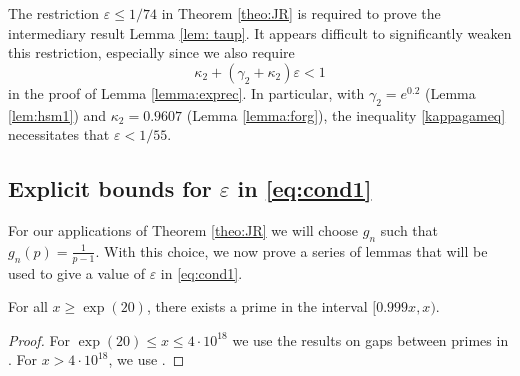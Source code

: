 \documentclass[12pt]{amsart}
\begin{document}
\begin{remark}
    The restriction $\varepsilon\leq 1/74$ in Theorem \ref{theo:JR} is required to prove the intermediary result Lemma \ref{lem: taup}. It appears difficult to significantly weaken this restriction, especially since we also require 
    \begin{equation}\label{kappagameq}
        \kappa_2+(\gamma_2+\kappa_2)\varepsilon<1
    \end{equation}
    in the proof of Lemma \ref{lemma:exprec}. In particular, with $\gamma_2=e^{0.2}$ (Lemma \ref{lem:hsm1}) and $\kappa_2=0.9607$ (Lemma \ref{lemma:forg}), the inequality \eqref{kappagameq} necessitates that $\varepsilon<1/55$.
\end{remark}

\subsection{Explicit bounds for $\varepsilon$ in \eqref{eq:cond1}} \label{subsec: expl-epsilon}
For our applications of Theorem \ref{theo:JR} we will choose $g_n$ such that $g_n(p)=\frac{1}{p-1}$. With this choice, we now prove a series of lemmas that will be used to give a value of $\varepsilon$ in \eqref{eq:cond1}.
\begin{lemma}\label{betrandlem}
    For all $x\ge \exp(20)$, there exists a prime in the interval $[0.999x,x)$.
\end{lemma}
\begin{proof}
    For $\exp(20)\le x\le 4\cdot 10^{18}$ we use the results on gaps between primes in \cite[Table 8]{O_H_P_14}. For $x>4\cdot 10^{18}$, we use \cite[Table 2]{Kadiri2}.
\end{proof}
\end{document}
